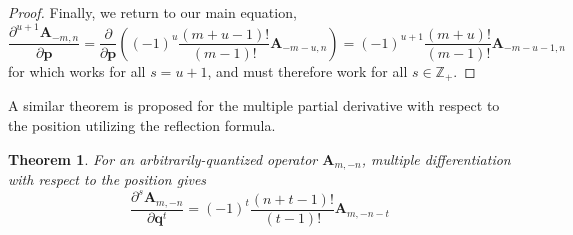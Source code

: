 \documentclass[a4paper]{article}
\newtheorem{theorem}{Theorem}[section]
\theoremstyle{definition}
\begin{document}
\begin{proof}
	Finally, we return to our main equation,
	\begin{equation}
		\frac{\partial^{u+1}\textbf{A}_{-m,n}}{\partial\textbf{p}}=\frac{\partial}{\partial\textbf{p}}\left((-1)^u\frac{(m+u-1)!}{(m-1)!}\textbf{A}_{-m-u,n}\right) =(-1)^{u+1}\frac{(m+u)!}{(m-1)!}\textbf{A}_{-m-u-1,n}
	\end{equation}
	for which works for all $s=u+1$, and must therefore work for all $s\in\mathbb{Z}_+$.
\end{proof}

A similar theorem is proposed for the multiple partial derivative with respect to the position utilizing the reflection formula.
\begin{theorem}
	For an arbitrarily-quantized operator $\textbf{A}_{m,-n}$, multiple differentiation with respect to the position	gives
	\begin{equation}
		\frac{\partial^s\textbf{A}_{m,-n}}{\partial\textbf{q}^t}=(-1)^{t}\frac{(n+t-1)!}{(t-1)!}\textbf{A}_{m,-n-t}
	\end{equation}
\end{theorem}
\end{document}
